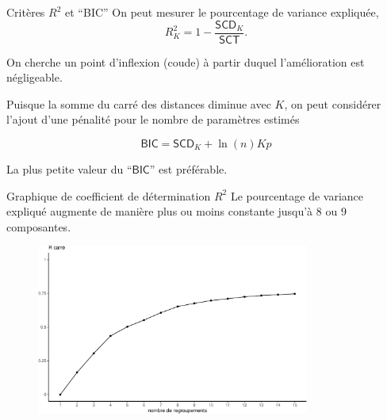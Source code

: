 \documentclass[
  ignorenonframetext,
]{beamer}
\begin{document}
\begin{frame}{Critères \(R^2\) et ``BIC''}
\protect\hypertarget{crituxe8res-r2-et-bic}{}
On peut mesurer le pourcentage de variance expliquée,
\[R^2_K = 1-\frac{\mathsf{SCD}_K}{\mathsf{SCT}}.\]

On cherche un point d'inflexion (coude) à partir duquel l'amélioration
est négligeable.

Puisque la somme du carré des distances diminue avec \(K\), on peut
considérer l'ajout d'une pénalité pour le nombre de paramètres estimés

\[\textsf{BIC}=\mathsf{SCD}_K + \ln(n)Kp\]

La plus petite valeur du ``\(\textsf{BIC}\)'' est préférable.
\end{frame}

\begin{frame}{Graphique de coefficient de détermination \(R^2\)}
\protect\hypertarget{graphique-de-coefficient-de-duxe9termination-r2}{}
Le pourcentage de variance expliqué augmente de manière plus ou moins
constante jusqu'à 8 ou 9 composantes.

\begin{figure}

{\centering \includegraphics[width=0.8\textwidth,height=\textheight]{MATH60602-diapos11_files/figure-beamer/unnamed-chunk-16-1.pdf}

}

\end{figure}
\end{frame}
\end{document}
